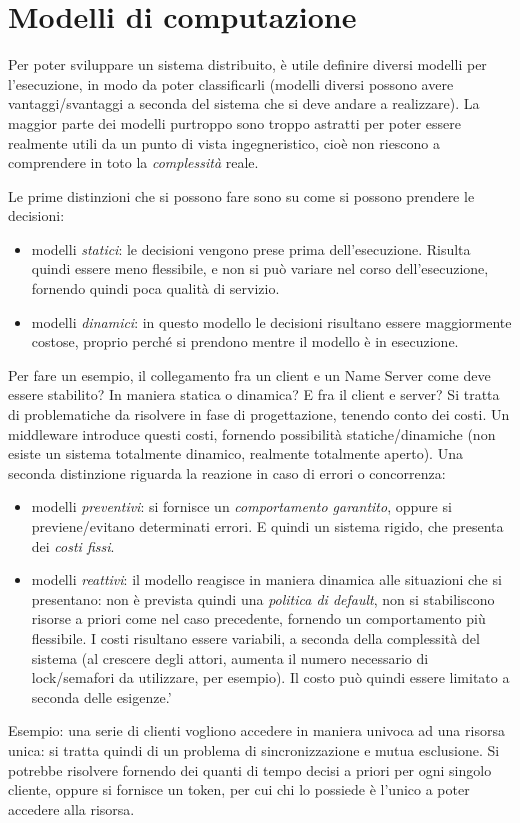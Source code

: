 \section{Modelli di computazione}
Per poter sviluppare un sistema distribuito, è utile definire diversi modelli per l'esecuzione, in modo da poter
classificarli (modelli diversi possono avere vantaggi/svantaggi a seconda del sistema che si deve andare a realizzare).
La maggior parte dei modelli purtroppo sono troppo astratti per poter essere realmente utili da un punto di vista
ingegneristico, cioè non riescono a comprendere in toto la \textit{complessità} reale.

Le prime distinzioni che si possono fare sono su come si possono prendere le decisioni:
\begin{itemize}
 \item modelli \textit{statici}: le decisioni vengono prese prima dell'esecuzione. Risulta quindi essere meno
flessibile, e non si può variare nel corso dell'esecuzione, fornendo quindi poca qualità di servizio.
\item modelli \textit{dinamici}: in questo modello le decisioni risultano essere maggiormente costose, proprio perché 
si prendono mentre il modello è in esecuzione.
\end{itemize}
Per fare un esempio, il collegamento fra un client e un Name Server come deve essere stabilito? In maniera statica o
dinamica? E fra il client e server? Si tratta di problematiche da risolvere in fase di progettazione, tenendo conto 
dei costi. Un middleware introduce questi costi, fornendo possibilità statiche/dinamiche (non esiste un sistema
totalmente dinamico, realmente totalmente aperto).
Una seconda distinzione riguarda la reazione in caso di errori o concorrenza:
\begin{itemize}
 \item modelli \textit{preventivi}: si fornisce un \textit{comportamento garantito}, oppure si previene/evitano
determinati errori. E quindi un sistema rigido, che presenta dei \textit{costi fissi}.
\item modelli \textit{reattivi}: il modello reagisce in maniera dinamica alle situazioni che si presentano: non è
prevista quindi una \textit{politica di default}, non si stabiliscono risorse a priori come nel caso precedente,
fornendo un comportamento più flessibile. I costi risultano essere variabili, a seconda della complessità del sistema
(al crescere degli attori, aumenta il numero necessario di lock/semafori da utilizzare, per esempio). Il costo può
quindi essere limitato a seconda delle esigenze.' 
\end{itemize}
Esempio: una serie di clienti vogliono accedere in maniera univoca ad una risorsa unica: si tratta quindi di un problema
di sincronizzazione e mutua esclusione. Si potrebbe risolvere fornendo dei quanti di tempo decisi a priori per ogni
singolo cliente, oppure si fornisce un token, per cui chi lo possiede è l'unico a poter accedere alla risorsa.

